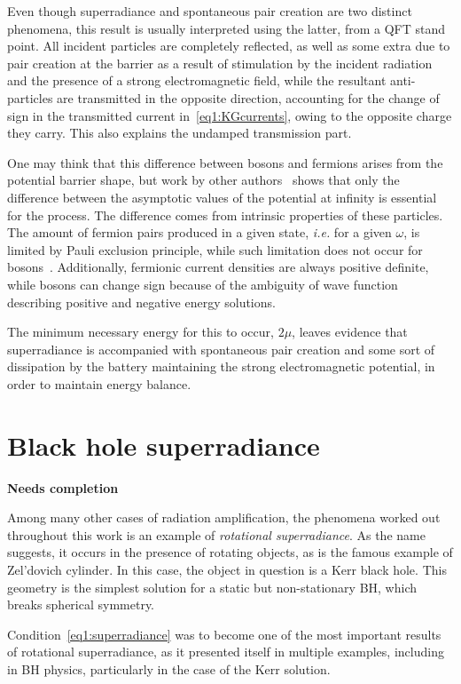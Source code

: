 Even though superradiance and spontaneous pair creation are two distinct phenomena, this result is usually interpreted using the latter, from a QFT stand point. 
All incident particles are completely reflected, as well as some extra due to pair creation at the barrier as a result of stimulation by the incident radiation and the presence of a strong electromagnetic field, while the resultant anti-particles are transmitted in the opposite direction, accounting for the change of sign in the transmitted current in~\eqref{eq1:KGcurrents}, owing to the opposite charge they carry. 
This also explains the undamped transmission part.

One may think that this difference between bosons and fermions arises from the potential barrier shape, but work by other authors~\cite{Sauter1931,Manogue1988,Winter1959} shows that only the difference between the asymptotic values of the potential at infinity is essential for the process. 
The difference comes from intrinsic properties of these particles. 
The amount of fermion pairs produced in a given state, \emph{i.e.} for a given $\omega$, is limited by Pauli exclusion principle, while such limitation does not occur for bosons~\cite{Brito2015}. 
Additionally, fermionic current densities are always positive definite, while bosons can change sign because of the ambiguity of wave function describing positive and negative energy solutions. 

The minimum necessary energy for this to occur, $2\mu$, leaves evidence that superradiance is accompanied with spontaneous pair creation and some sort of dissipation by the battery maintaining the strong electromagnetic potential, in order to maintain energy balance.   



\section{Black hole superradiance}

\textbf{Needs completion}

Among many other cases of radiation amplification, the phenomena worked out throughout this work is an example of \emph{rotational superradiance}. 
As the name suggests, it occurs in the presence of rotating objects, as is the famous example of Zel'dovich cylinder. In this case, the object in question is a Kerr black hole. 
This geometry is the simplest solution for a static but non-stationary BH, which breaks spherical symmetry.

Condition~\eqref{eq1:superradiance} was to become one of the most important results of rotational superradiance, as it presented itself in multiple examples, including in BH physics, particularly in the case of the Kerr solution.




\cleardoublepage
